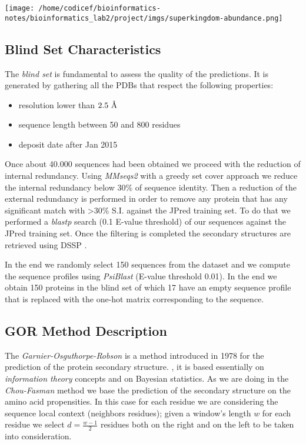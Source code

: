 \documentclass[a4paper,twocolumn]{article}
\begin{document}
\begin{center}
\texttt{[image: /home/codicef/bioinformatics-notes/bioinformatics\_lab2/project/imgs/superkingdom-abundance.png]}
\end{center}


\subsection{Blind Set Characteristics}
\label{sec:orgc4cb65c}
The \emph{blind set} is fundamental to assess the quality of the predictions. It is generated
by gathering all the PDBs that respect the following properties:
\begin{itemize}
\item resolution lower than \(2.5 \textup{~\AA}\)
\item sequence length between 50 and 800 residues
\item deposit date after Jan 2015
\end{itemize}

Once about 40.000 sequences had been obtained we proceed with the reduction of internal
redundancy. Using \emph{MMseqs2} \cite{mmseqs} with a greedy set cover approach we reduce the
internal redundancy below 30\% of sequence identity. Then a reduction of the external
redundancy is performed in order to remove any protein that has any significant
match with >30\% S.I. against the JPred training set. To do that we
performed a \emph{blastp} search (0.1 E-value threshold) of our sequences against the JPred training set. Once
the filtering is completed the secondary structures are retrieved using DSSP \cite{dssp} .

In the end we randomly select 150 sequences from the dataset and we compute the
sequence profiles using \emph{PsiBlast} \cite{psiblast} (E-value threshold 0.01). In the end we obtain
150 proteins in the blind set of which 17 have an empty sequence profile that is
replaced with the one-hot matrix corresponding to the sequence.
\subsection{GOR Method Description}
\label{sec:org392d998}
The \emph{Garnier-Osguthorpe-Robson} is a method introduced in 1978 for the prediction
of the protein secondary structure. \cite{gor} , it is based essentially on \emph{information theory} concepts and on
Bayesian statistics. As we are doing in the \emph{Chou-Fasman} method we base the
prediction of the secondary structure on the amino acid propensities. In this
case for each residue we are considering the sequence local context (neighbors
residues); given a window's length \(w\) for each residue we select \(d = \frac{w-1}{2}\)
residues both on the right and on the left to be taken into consideration.
\end{document}
